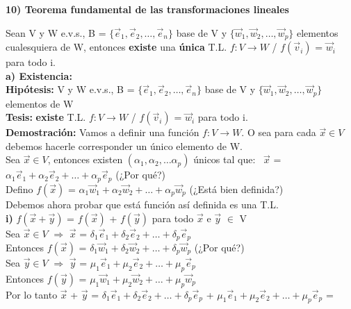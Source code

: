 \documentclass[11pt]{article}
\begin{document}
\vspace{2mm} \noindent
{\Large \bfseries{10) Teorema fundamental de las transformaciones lineales}}

\vspace{2mm} \noindent
Sean V y W e.v.s., B = $\{\vec{e}_1, \vec{e}_2, \hdots, \vec{e}_n\}$ base de V y $\{\vec{w}_1, \vec{w}_2, \hdots, \vec{w}_p\}$ elementos cualesquiera de W, entonces {\bfseries existe} una {\bfseries única} T.L. $f: V \rightarrow W$ / $f(\vec{v}_i)$ = $\vec{w}_i$ para todo i. \\
{\bfseries a) Existencia:} \\
{\bfseries Hipótesis:} V y W e.v.s., B = $\{\vec{e}_1, \vec{e}_2, \hdots, \vec{e}_n\}$ base de V y $\{\vec{w}_1, \vec{w}_2, \hdots, \vec{w}_p\}$ elementos de W \\
{\bfseries Tesis:} {\bfseries existe} T.L. $f: V \rightarrow W$ / $f(\vec{v}_i)$ = $\vec{w}_i$ para todo i. \\
{\bfseries Demostración:} Vamos a definir una función $f: V \rightarrow W$. O sea para cada $\vec{x} \in V$ debemos hacerle corresponder un único elemento de W. \\
Sea $\vec{x} \in V$, entonces existen $(\alpha_1, \alpha_2, \hdots \alpha_p)$ únicos tal que: \
$\vec{x}$ = $\alpha_1 \vec{e}_1 + \alpha_2 \vec{e}_2 + \hdots + \alpha_p \vec{e}_p$ (¿Por qué?)\\
Defino $f(\vec{x})$ = $\alpha_1 \vec{w}_1 + \alpha_2 \vec{w}_2 + \hdots + \alpha_p \vec{w}_p$ (¿Está bien definida?) \\
Debemos ahora probar que está función así definida es una T.L. \\
{\bfseries i)} $f(\vec{x} + \vec{y})$ = $f(\vec{x})$ + $f(\vec{y})$ para todo $\vec{x}$ e $\vec{y}$ $\in$ V \\
Sea $\vec{x} \in V$ $\Rightarrow$ $\vec{x}$ = $\delta_1\vec{e}_1 + \delta_2 \vec{e}_2 + \hdots + \delta_p \vec{e}_p$ \\
Entonces $f(\vec{x})$ = $\delta_1\vec{w}_1 + \delta_2 \vec{w}_2 + \hdots + \delta_p \vec{w}_p$ (¿Por qué?) \\
Sea $\vec{y} \in V$ $\Rightarrow$ $\vec{y}$ = $\mu_1\vec{e}_1 + \mu_2 \vec{e}_2 + \hdots + \mu_p \vec{e}_p$ \\
Entonces $f(\vec{y})$ = $\mu_1\vec{w}_1 + \mu_2 \vec{w}_2 + \hdots + \mu_p \vec{w}_p$ \\
Por lo tanto $\vec{x}$ + $\vec{y}$ = $\delta_1\vec{e}_1 + \delta_2 \vec{e}_2 + \hdots + \delta_p \vec{e}_p$ + $\mu_1\vec{e}_1 + \mu_2 \vec{e}_2 + \hdots + \mu_p \vec{e}_p$ = \\
\end{document}
